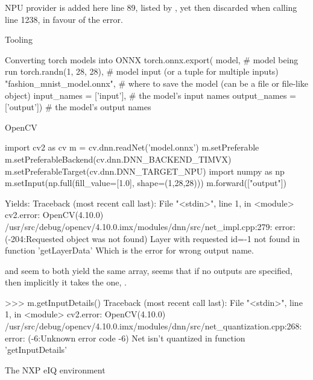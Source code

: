 NPU provider is added here line 89,
listed by ,
yet then discarded when calling  line 1238,
in favour of the  error.

\secc Tooling


\secc Converting torch models into ONNX
\begtt{}
torch.onnx.export(
model,                                # model being run
torch.randn(1, 28, 28),    # model input (or a tuple for multiple inputs)
"fashion_mnist_model.onnx",           # where to save the model (can be a file or file-like object)
input_names = ['input'],              # the model's input names
output_names = ['output'])            # the model's output names
\endtt

\sec OpenCV

\begtt{}
import cv2 as cv
m = cv.dnn.readNet('model.onnx')
m.setPreferable
m.setPreferableBackend(cv.dnn.DNN_BACKEND_TIMVX)
m.setPreferableTarget(cv.dnn.DNN_TARGET_NPU)
import numpy as np
m.setInput(np.full(fill_value=[1.0], shape=(1,28,28)))
m.forward(["output"])
\endtt

Yields:
\begtt
Traceback (most recent call last):
  File "<stdin>", line 1, in <module>
cv2.error: OpenCV(4.10.0) /usr/src/debug/opencv/4.10.0.imx/modules/dnn/src/net_impl.cpp:279: error: (-204:Requested object was not found) Layer with requested id=-1 not found in function 'getLayerData'
\endtt
Which is the error for wrong output name.

 and 
seem to both yield the same array,
seems that if no outputs are specified,
then implicitly it takes the one, .

\begtt
>>> m.getInputDetails()
Traceback (most recent call last):
  File "<stdin>", line 1, in <module>
cv2.error: OpenCV(4.10.0) /usr/src/debug/opencv/4.10.0.imx/modules/dnn/src/net_quantization.cpp:268: error: (-6:Unknown error code -6) Net isn't quantized in function 'getInputDetails'
\endtt

\sec The NXP eIQ environment

